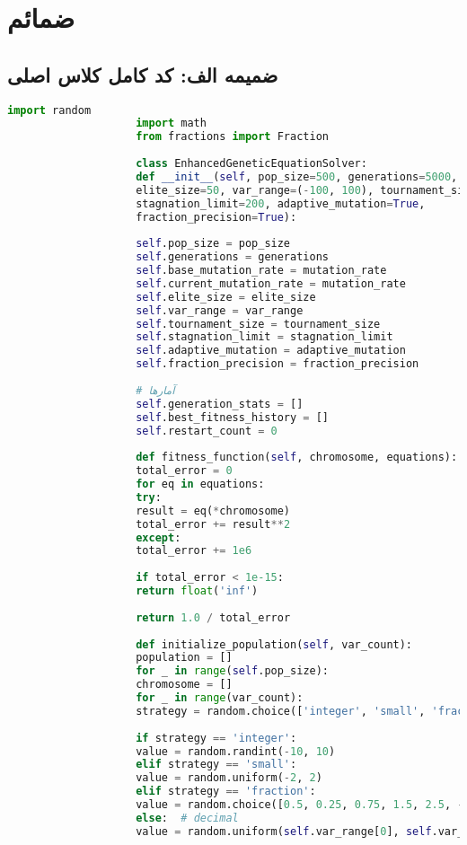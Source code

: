\documentclass[12pt,a4paper]{article}
\newenvironment{ltrcode}{\lr\bgroup}{\egroup}
\begin{document}
			\section{ضمائم}
			
			\subsection{ضمیمه الف: کد کامل کلاس اصلی}
			
			\begin{ltrcode}
				\begin{lstlisting}[language=Python, caption=کلاس کامل EnhancedGeneticEquationSolver]
					import random
					import math
					from fractions import Fraction
					
					class EnhancedGeneticEquationSolver:
					def __init__(self, pop_size=500, generations=5000, mutation_rate=0.2, 
					elite_size=50, var_range=(-100, 100), tournament_size=5,
					stagnation_limit=200, adaptive_mutation=True,
					fraction_precision=True):
					
					self.pop_size = pop_size
					self.generations = generations
					self.base_mutation_rate = mutation_rate
					self.current_mutation_rate = mutation_rate
					self.elite_size = elite_size
					self.var_range = var_range
					self.tournament_size = tournament_size
					self.stagnation_limit = stagnation_limit
					self.adaptive_mutation = adaptive_mutation
					self.fraction_precision = fraction_precision
					
					# آمارها
					self.generation_stats = []
					self.best_fitness_history = []
					self.restart_count = 0
					
					def fitness_function(self, chromosome, equations):
					total_error = 0
					for eq in equations:
					try:
					result = eq(*chromosome)
					total_error += result**2
					except:
					total_error += 1e6
					
					if total_error < 1e-15:
					return float('inf')
					
					return 1.0 / total_error
					
					def initialize_population(self, var_count):
					population = []
					for _ in range(self.pop_size):
					chromosome = []
					for _ in range(var_count):
					strategy = random.choice(['integer', 'small', 'fraction', 'decimal'])
					
					if strategy == 'integer':
					value = random.randint(-10, 10)
					elif strategy == 'small':
					value = random.uniform(-2, 2)
					elif strategy == 'fraction':
					value = random.choice([0.5, 0.25, 0.75, 1.5, 2.5, -0.5, -0.25])
					else:  # decimal
					value = random.uniform(self.var_range[0], self.var_range[1])
					

\end{lstlisting}
\end{ltrcode}
\end{document}
